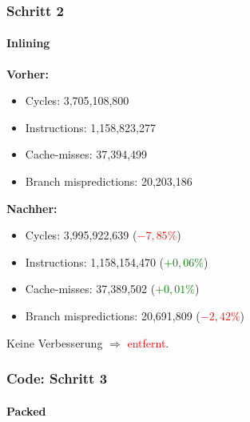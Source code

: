 \documentclass{beamer}
\newcommand{\success}[1]{\textcolor{green}{#1}}
\newcommand{\fail}[1]{\textcolor{red}{#1}}
\begin{document}
  \begin{frame}
  	\frametitle{Schritt 2}
		\framesubtitle{Inlining}
  	\textbf{Vorher:}
  	\begin{itemize}
			\item Cycles: 3,705,108,800 \\
			\item Instructions: 1,158,823,277\\
			\item Cache-misses: 37,394,499\\
			\item Branch mispredictions: 20,203,186\\
		\end{itemize}

		\textbf{Nachher:}
  	\begin{itemize}
			\item Cycles: 3,995,922,639 (\fail{$- 7,85 \%$})\\
			\item Instructions:  1,158,154,470 (\success{$+ 0,06 \%$})\\
			\item Cache-misses: 37,389,502 (\success{$+ 0,01 \%$})\\
			\item Branch mispredictions: 20,691,809 (\fail{$- 2,42 \%$})\\
		\end{itemize}
		Keine Verbesserung $\Rightarrow$ \fail{entfernt}.
  \end{frame}

	\begin{frame}
  	\frametitle{Code: Schritt 3}
  	\framesubtitle{Packed}
		\sPacked
  \end{frame}
\end{document}
